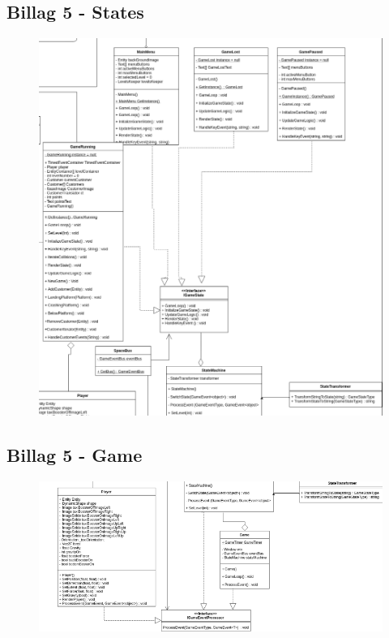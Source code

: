 \subsection{Billag 5 - States}
\begin{figure}[H]
  \includegraphics[width=\linewidth]{State.png}
\end{figure}
\subsection{Billag 5 - Game}
\begin{figure}[H]
  \includegraphics[width=\linewidth]{Game.png}
\end{figure}

